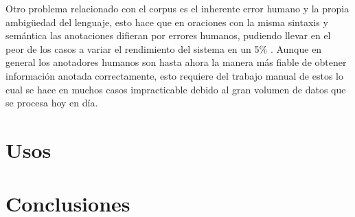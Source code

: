 \documentclass[runningheads]{llncs}
\begin{document}
Otro problema relacionado con el corpus es el inherente error humano y la propia ambigüedad del lenguaje, esto hace que en oraciones con la misma sintaxis y semántica las anotaciones difieran por errores humanos, pudiendo llevar en el peor de los casos a variar el rendimiento del sistema en un 5\% \cite{posdecisiontree}. Aunque en general los anotadores humanos son hasta ahora la manera más fiable de obtener información anotada correctamente, esto requiere del trabajo manual de estos lo cual se hace en muchos casos impracticable debido al gran volumen de datos que se procesa hoy en día.

\section{Usos}


\section{Conclusiones}

\end{document}
